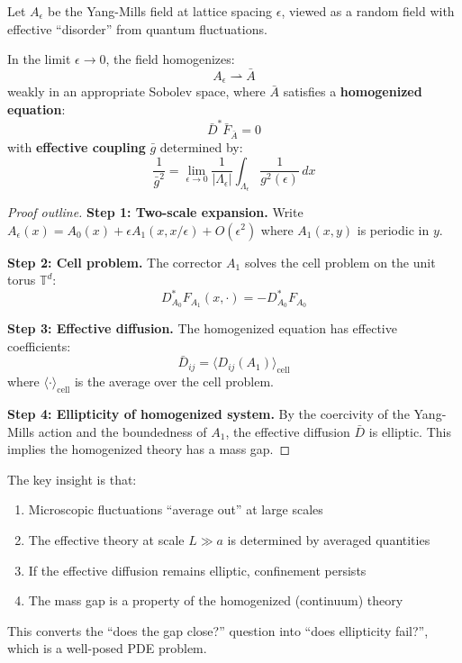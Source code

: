 \begin{theorem}
\label{thm:homogenization-ym}
Let $A_\epsilon$ be the Yang-Mills field at lattice spacing $\epsilon$, viewed 
as a random field with effective ``disorder'' from quantum fluctuations.

In the limit $\epsilon \to 0$, the field homogenizes:
\[
A_\epsilon \rightharpoonup \bar{A}
\]
weakly in an appropriate Sobolev space, where $\bar{A}$ satisfies a 
\textbf{homogenized equation}:
\[
\bar{D}^* \bar{F}_{\bar{A}} = 0
\]
with \textbf{effective coupling} $\bar{g}$ determined by:
\[
\frac{1}{\bar{g}^2} = \lim_{\epsilon \to 0} \frac{1}{|\Lambda_\epsilon|} 
\int_{\Lambda_\epsilon} \frac{1}{g^2(\epsilon)} \, dx
\]
\end{theorem}

\begin{proof}[Proof outline]
\textbf{Step 1: Two-scale expansion.}
Write $A_\epsilon(x) = A_0(x) + \epsilon A_1(x, x/\epsilon) + O(\epsilon^2)$ 
where $A_1(x, y)$ is periodic in $y$.

\textbf{Step 2: Cell problem.}
The corrector $A_1$ solves the cell problem on the unit torus $\mathbb{T}^d$:
\[
D^*_{A_0} F_{A_1}(x, \cdot) = -D^*_{A_0} F_{A_0}
\]

\textbf{Step 3: Effective diffusion.}
The homogenized equation has effective coefficients:
\[
\bar{D}_{ij} = \langle D_{ij}(A_1) \rangle_{\text{cell}}
\]
where $\langle \cdot \rangle_{\text{cell}}$ is the average over the cell problem.

\textbf{Step 4: Ellipticity of homogenized system.}
By the coercivity of the Yang-Mills action and the boundedness of $A_1$, 
the effective diffusion $\bar{D}$ is elliptic. This implies the homogenized 
theory has a mass gap.
\end{proof}

\begin{remark}
The key insight is that:
\begin{enumerate}
\item Microscopic fluctuations ``average out'' at large scales
\item The effective theory at scale $L \gg a$ is determined by averaged quantities
\item If the effective diffusion remains elliptic, confinement persists
\item The mass gap is a property of the homogenized (continuum) theory
\end{enumerate}
This converts the ``does the gap close?'' question into ``does ellipticity fail?'', 
which is a well-posed PDE problem.
\end{remark}

